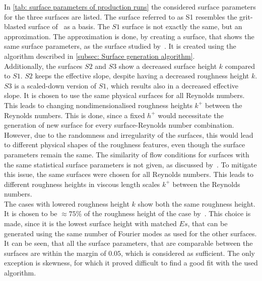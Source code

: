In \autoref{tab: surface parameters of production runs} the considered surface parameters for the three surfaces are listed.
The surface referred to as S1 resembles the grit-blasted surface of~\cite{demaioDirectNumericalSimulation2023} as a basis.
The $S1$ surface is not exactly the same, but an approximation.
The approximation is done, by creating a surface, that shows the same surface parameters, as the surface studied by~\cite{demaioDirectNumericalSimulation2023}.
It is created using the algorithm described in \autoref{subsec: Surface generation algorithm}.\\
Additionally, the surfaces $S2$ and $S3$ show a decreased surface height $k$ compared to $S1$.
$S2$ keeps the effective slope, despite having a decreased roughness height $k$.
$S3$ is a scaled-down version of $S1$, which results also in a decreased effective slope.
It is chosen to use the same physical surfaces for all Reynolds numbers.
This leads to changing nondimensionalised roughness heights $k^+$ between the Reynolds numbers.
This is done, since a fixed $h^+$ would necessitate the generation of new surface for every surface-Reynolds number combination.
However, due to the randomness and irregularity of the surfaces, this would lead to different physical shapes of the roughness features, even though the surface parameters remain the same. 
The similarity of flow conditions for surfaces with the same statistical surface parameters is not given, as discussed by~\cite{forooghiUniversalRoughnessCorrelation2017,chungPredictingDragRough2021}.
To mitigate this issue, the same surfaces were chosen for all Reynolds numbers.
This leads to different roughness heights in viscous length scales $k^+$ between the Reynolds numbers.\\
The cases with lowered roughness height $k$ show both the same roughness height.
It is chosen to be $\approx 75\%$ of the roughness height of the case by~\cite{demaioDirectNumericalSimulation2023}.
This choice is made, since it is the lowest surface height with matched $Es$, that can be generated using the same number of Fourier modes as used for the other surfaces.
It can be seen, that all the surface parameters, that are comparable between the surfaces are within the margin of $0.05$, which is considered as sufficient.
The only exception is skewness, for which it proved difficult to find a good fit with the used algorithm.
